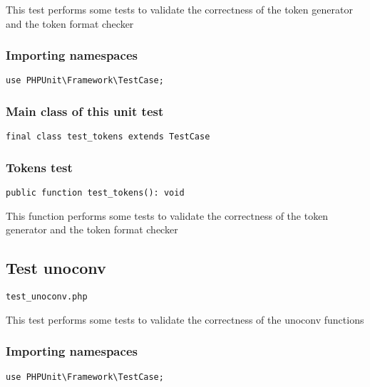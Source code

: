 \documentclass[a4paper]{article}
\begin{document}
This test performs some tests to validate the correctness
of the token generator and the token format checker

\hypertarget{toc352}{}
\subsubsection{Importing namespaces}

\begin{lstlisting}
use PHPUnit\Framework\TestCase;
\end{lstlisting}

\hypertarget{toc353}{}
\subsubsection{Main class of this unit test}

\begin{lstlisting}
final class test_tokens extends TestCase
\end{lstlisting}

\hypertarget{toc354}{}
\subsubsection{Tokens test}

\begin{lstlisting}
public function test_tokens(): void
\end{lstlisting}

This function performs some tests to validate the correctness
of the token generator and the token format checker

\hypertarget{toc355}{}
\subsection{Test unoconv}

\begin{lstlisting}
test_unoconv.php
\end{lstlisting}

This test performs some tests to validate the correctness
of the unoconv functions

\hypertarget{toc356}{}
\subsubsection{Importing namespaces}

\begin{lstlisting}
use PHPUnit\Framework\TestCase;
\end{lstlisting}
\end{document}
